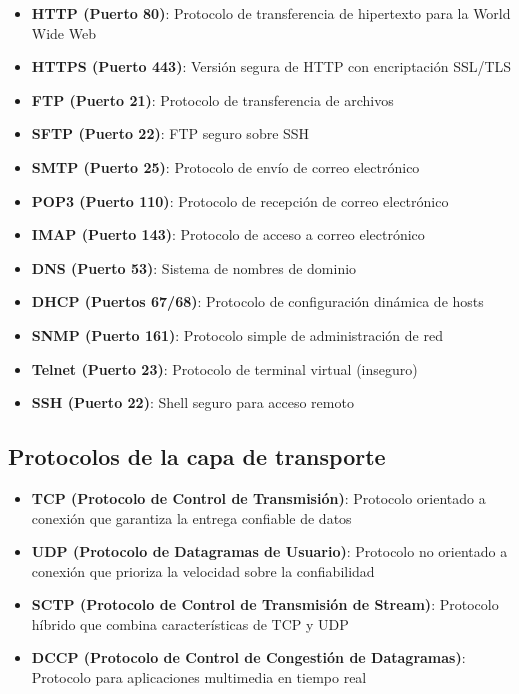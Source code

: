 \begin{itemize}
    \item \textbf{HTTP (Puerto 80)}: Protocolo de transferencia de hipertexto para la World Wide Web
    \item \textbf{HTTPS (Puerto 443)}: Versión segura de HTTP con encriptación SSL/TLS
    \item \textbf{FTP (Puerto 21)}: Protocolo de transferencia de archivos
    \item \textbf{SFTP (Puerto 22)}: FTP seguro sobre SSH
    \item \textbf{SMTP (Puerto 25)}: Protocolo de envío de correo electrónico
    \item \textbf{POP3 (Puerto 110)}: Protocolo de recepción de correo electrónico
    \item \textbf{IMAP (Puerto 143)}: Protocolo de acceso a correo electrónico
    \item \textbf{DNS (Puerto 53)}: Sistema de nombres de dominio
    \item \textbf{DHCP (Puertos 67/68)}: Protocolo de configuración dinámica de hosts
    \item \textbf{SNMP (Puerto 161)}: Protocolo simple de administración de red
    \item \textbf{Telnet (Puerto 23)}: Protocolo de terminal virtual (inseguro)
    \item \textbf{SSH (Puerto 22)}: Shell seguro para acceso remoto
\end{itemize}

\subsection{Protocolos de la capa de transporte}

\begin{itemize}
    \item \textbf{TCP (Protocolo de Control de Transmisión)}: Protocolo orientado a conexión que garantiza la entrega confiable de datos
    \item \textbf{UDP (Protocolo de Datagramas de Usuario)}: Protocolo no orientado a conexión que prioriza la velocidad sobre la confiabilidad
    \item \textbf{SCTP (Protocolo de Control de Transmisión de Stream)}: Protocolo híbrido que combina características de TCP y UDP
    \item \textbf{DCCP (Protocolo de Control de Congestión de Datagramas)}: Protocolo para aplicaciones multimedia en tiempo real
\end{itemize}

